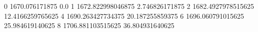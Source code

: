0 1670.076171875 0.0
1 1672.822998046875 2.746826171875
2 1682.4927978515625 12.4166259765625
4 1690.263427734375 20.187255859375
6 1696.060791015625 25.984619140625
8 1706.881103515625 36.804931640625
